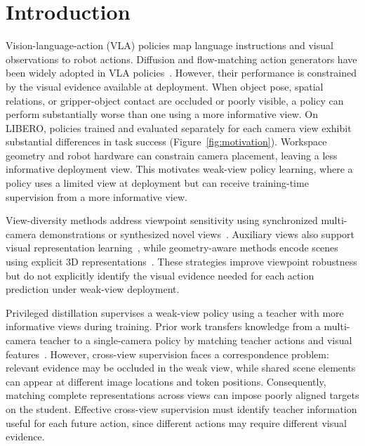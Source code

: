 \section{Introduction}

Vision-language-action (VLA) policies map language instructions and visual observations to robot actions.
Diffusion and flow-matching action generators have been widely adopted in VLA policies~\cite{chi2025diffusionpolicy,wen2025diffusionvla,black2025pi0}.
However, their performance is constrained by the visual evidence available at deployment.
When object pose, spatial relations, or gripper-object contact are occluded or poorly visible, a policy can perform substantially worse than one using a more informative view.
On LIBERO, policies trained and evaluated separately for each camera view exhibit substantial differences in task success (Figure~\ref{fig:motivation}).
Workspace geometry and robot hardware can constrain camera placement, leaving a less informative deployment view.
This motivates weak-view policy learning, where a policy uses a limited view at deployment but can receive training-time supervision from a more informative view.

View-diversity methods address viewpoint sensitivity using synchronized multi-camera demonstrations or synthesized novel views~\cite{ablett2021multiview,tian2025vista}. Auxiliary views also support visual representation learning~\cite{seo2023multiview}, while geometry-aware methods encode scenes using explicit 3D representations~\cite{shridhar2023peract,goyal2023rvt}. These strategies improve viewpoint robustness but do not explicitly identify the visual evidence needed for each action prediction under weak-view deployment.

Privileged distillation supervises a weak-view policy using a teacher with more informative views during training. Prior work transfers knowledge from a multi-camera teacher to a single-camera policy by matching teacher actions and visual features~\cite{acar2024multicamera}. However, cross-view supervision faces a correspondence problem: relevant evidence may be occluded in the weak view, while shared scene elements can appear at different image locations and token positions. Consequently, matching complete representations across views can impose poorly aligned targets on the student. Effective cross-view supervision must identify teacher information useful for each future action, since different actions may require different visual evidence.

